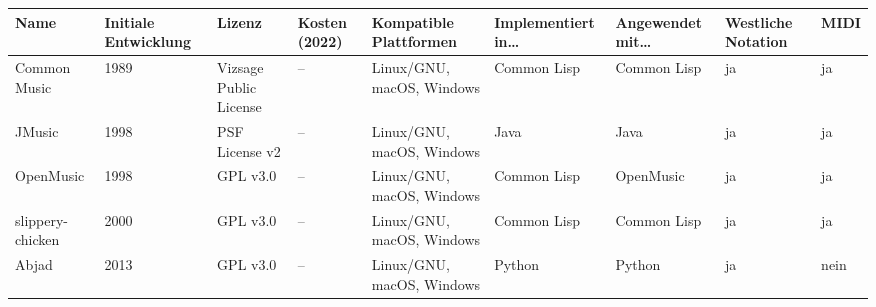 \documentclass[12pt,a4paper,ngerman]{article}
\begin{document}
\begin{landscape}
    \begin{table}[h!]

        \begin{center}

            \begin{smaller}

                \begin{tabularx}{22cm}{X X X X X X X X X}
                    \hline
                    Name &
                    Initiale Entwicklung &
                    Lizenz &
                    Kosten (2022) &
                    Kompatible Plattformen &
                    Implementiert in\dots &
                    Angewendet mit\dots & 
                    Westliche Notation &
                    MIDI \\ [0.5ex] 

                    \hline\hline

                    Common Music &
                    1989 &
                    Vizsage Public License &
                    -- &
                    Linux/GNU, macOS, Windows &
                    Common Lisp &
                    Common Lisp & 
                    ja &
                    ja \\[1cm]


                    JMusic &
                    1998 &
                    PSF License v2 &
                    -- &
                    Linux/GNU, macOS, Windows &
                    Java &
                    Java & 
                    ja &
                    ja \\[1cm]

                    OpenMusic &
                    1998 &
                    GPL v3.0 &
                    -- &
                    Linux/GNU, macOS, Windows &
                    Common Lisp &
                    OpenMusic & 
                    ja &
                    ja \\[1cm]

                    slippery-chicken &
                    2000 &
                    GPL v3.0 &
                    -- &
                    Linux/GNU, macOS, Windows &
                    Common Lisp &
                    Common Lisp & 
                    ja &
                    ja \\[1cm]

                    Abjad &
                    2013 &
                    GPL v3.0 &
                    -- &
                    Linux/GNU, macOS, Windows &
                    Python &
                    Python & 
                    ja &
                    nein \\[1cm]


\end{tabularx}
\end{smaller}
\end{center}
\end{table}
\end{landscape}
\end{document}
